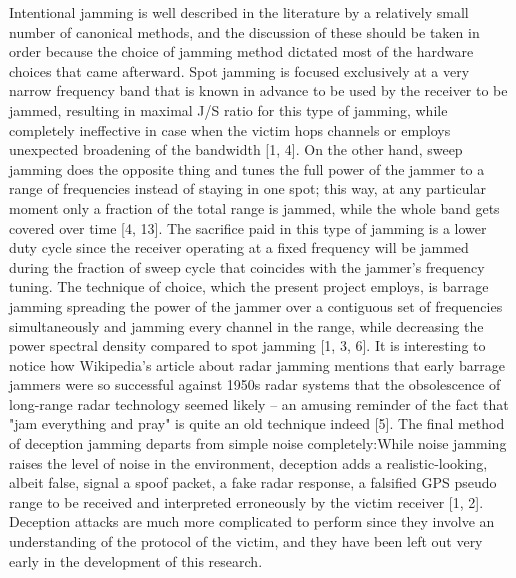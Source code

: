 \documentclass[12pt,a4paper]{report}
\begin{document}
	\vspace{0.5cm}
	
	Intentional jamming is well described in the literature by a relatively small number of canonical methods, and the discussion of these should be taken in order because the choice of jamming method dictated most of the hardware choices that came afterward. Spot jamming is focused exclusively at a very narrow frequency band that is known in advance to be used by the receiver to be jammed, resulting in maximal J/S ratio for this type of jamming, while completely ineffective in case when the victim hops channels or employs unexpected broadening of the bandwidth [1, 4]. On the other hand, sweep jamming does the opposite thing and tunes the full power of the jammer to a range of frequencies instead of staying in one spot; this way, at any particular moment only a fraction of the total range is jammed, while the whole band gets covered over time [4, 13]. The sacrifice paid in this type of jamming is a lower duty cycle since the receiver operating at a fixed frequency will be jammed during the fraction of sweep cycle that coincides with the jammer's frequency tuning. The technique of choice, which the present project employs, is barrage jamming  spreading the power of the jammer over a contiguous set of frequencies simultaneously and jamming every channel in the range, while decreasing the power spectral density compared to spot jamming [1, 3, 6]. It is interesting to notice how Wikipedia's article about radar jamming mentions that early barrage jammers were so successful against 1950s radar systems that the obsolescence of long-range radar technology seemed likely – an amusing reminder of the fact that "jam everything and pray" is quite an old technique indeed [5]. The final method of deception jamming departs from simple noise completely:While noise jamming raises the level of noise in the environment, deception adds a realistic-looking, albeit false, signal  a spoof packet, a fake radar response, a falsified GPS pseudo range  to be received and interpreted erroneously by the victim receiver [1, 2]. Deception attacks are much more complicated to perform since they involve an understanding of the protocol of the victim, and they have been left out very early in the development of this research.
	
	\vspace{0.5cm}
	
\end{document}
